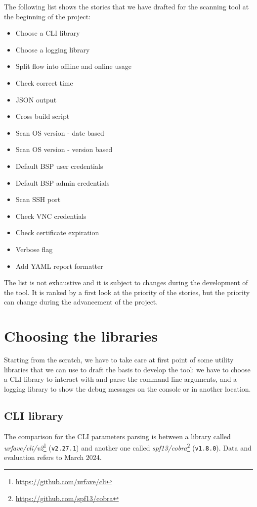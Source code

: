 The following list shows the stories that we have drafted for the scanning tool at the beginning of the project:
\begin{itemize}
  \item Choose a CLI library
  \item Choose a logging library
  \item Split flow into offline and online usage
  \item Check correct time
  \item JSON output
  \item Cross build script
  \item Scan OS version - date based
  \item Scan OS version - version based
  \item Default BSP user credentials
  \item Default BSP admin credentials
  \item Scan SSH port
  \item Check VNC credentials
  \item Check certificate expiration
  \item Verbose flag
  \item Add YAML report formatter
\end{itemize}

The list is not exhaustive and it is subject to changes during the development of the tool. It is ranked by a first look at the priority of the stories, but the priority can change during the advancement of the project.

\section{Choosing the libraries}

Starting from the scratch, we have to take care at first point of some utility libraries that we can use to draft the basis to develop the tool: we have to choose a CLI library to interact with and parse the command-line arguments, and a logging library to show the debug messages on the console or in another location.

\subsection{CLI library}

The comparison for the CLI parameters parsing is between a library called \textit{urfave/cli/v2}\footnote{\url{https://github.com/urfave/cli}} (\texttt{v2.27.1}) and another one called \textit{spf13/cobra}\footnote{\url{https://github.com/spf13/cobra}} (\texttt{v1.8.0}). Data and evaluation refers to March 2024.

